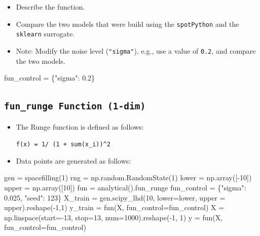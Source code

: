 \documentclass[
  letterpaper,
  DIV=11,
  numbers=noendperiod]{scrreprt}
\newenvironment{Shaded}{\begin{snugshade}}{\end{snugshade}}
\newcommand{\DecValTok}[1]{\textcolor[rgb]{0.68,0.00,0.00}{#1}}
\newcommand{\FloatTok}[1]{\textcolor[rgb]{0.68,0.00,0.00}{#1}}
\newcommand{\NormalTok}[1]{\textcolor[rgb]{0.00,0.23,0.31}{#1}}
\newcommand{\OperatorTok}[1]{\textcolor[rgb]{0.37,0.37,0.37}{#1}}
\newcommand{\StringTok}[1]{\textcolor[rgb]{0.13,0.47,0.30}{#1}}
\providecommand{\tightlist}{%
  \setlength{\itemsep}{0pt}\setlength{\parskip}{0pt}}\usepackage{longtable,booktabs,array}
\begin{document}
\begin{itemize}
\tightlist
\item
  Describe the function.
\item
  Compare the two models that were build using the \texttt{spotPython}
  and the \texttt{sklearn} surrogate.
\item
  Note: Modify the noise level (\texttt{"sigma"}), e.g., use a value of
  \texttt{0.2}, and compare the two models.
\end{itemize}

\begin{Shaded}
\begin{Highlighting}[]
\NormalTok{fun\_control }\OperatorTok{=}\NormalTok{ \{}\StringTok{"sigma"}\NormalTok{: }\FloatTok{0.2}\NormalTok{\}}
\end{Highlighting}
\end{Shaded}

\hypertarget{fun_runge-function-1-dim}{%
\subsection{\texorpdfstring{\texttt{fun\_runge\ Function\ (1-dim)}}{fun\_runge Function (1-dim)}}\label{fun_runge-function-1-dim}}

\begin{itemize}
\item
  The Runge function is defined as follows:

  \texttt{f(x)\ =\ 1/\ (1\ +\ sum(x\_i))\^{}2}
\item
  Data points are generated as follows:
\end{itemize}

\begin{Shaded}
\begin{Highlighting}[]
\NormalTok{gen }\OperatorTok{=}\NormalTok{ spacefilling(}\DecValTok{1}\NormalTok{)}
\NormalTok{rng }\OperatorTok{=}\NormalTok{ np.random.RandomState(}\DecValTok{1}\NormalTok{)}
\NormalTok{lower }\OperatorTok{=}\NormalTok{ np.array([}\OperatorTok{{-}}\DecValTok{10}\NormalTok{])}
\NormalTok{upper }\OperatorTok{=}\NormalTok{ np.array([}\DecValTok{10}\NormalTok{])}
\NormalTok{fun }\OperatorTok{=}\NormalTok{ analytical().fun\_runge}
\NormalTok{fun\_control }\OperatorTok{=}\NormalTok{ \{}\StringTok{"sigma"}\NormalTok{: }\FloatTok{0.025}\NormalTok{,}
               \StringTok{"seed"}\NormalTok{: }\DecValTok{123}\NormalTok{\}}
\NormalTok{X\_train }\OperatorTok{=}\NormalTok{ gen.scipy\_lhd(}\DecValTok{10}\NormalTok{, lower}\OperatorTok{=}\NormalTok{lower, upper }\OperatorTok{=}\NormalTok{ upper).reshape(}\OperatorTok{{-}}\DecValTok{1}\NormalTok{,}\DecValTok{1}\NormalTok{)}
\NormalTok{y\_train }\OperatorTok{=}\NormalTok{ fun(X, fun\_control}\OperatorTok{=}\NormalTok{fun\_control)}
\NormalTok{X }\OperatorTok{=}\NormalTok{ np.linspace(start}\OperatorTok{={-}}\DecValTok{13}\NormalTok{, stop}\OperatorTok{=}\DecValTok{13}\NormalTok{, num}\OperatorTok{=}\DecValTok{1000}\NormalTok{).reshape(}\OperatorTok{{-}}\DecValTok{1}\NormalTok{, }\DecValTok{1}\NormalTok{)}
\NormalTok{y }\OperatorTok{=}\NormalTok{ fun(X, fun\_control}\OperatorTok{=}\NormalTok{fun\_control)}
\end{Highlighting}
\end{Shaded}
\end{document}
